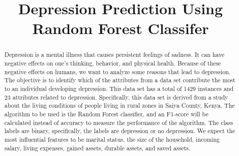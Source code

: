 \documentclass[conference]{IEEEtran}
\begin{document}
\title{Depression Prediction Using Random Forest Classifer\\}

\author{
\and
{}

\and
{}
\and
{}

}

\maketitle

\begin{abstract}
Depression is a mental illness that causes persistent feelings of sadness. It can have negative effects on one's thinking, behavior, and physical health. Because of these negative effects on humans, we want to analyze some reasons that lead to depression. The objective is to identify which of the attributes from a data set contribute the most to an individual developing depression. This data set has a total of 1429 instances and 23 attributes related to depression. Specifically, this data set is derived from a study about the living conditions of people living in rural zones in Saiya County, Kenya. The algorithm to be used is the Random Forest classifier, and an F1-score will be calculated instead of accuracy to measure the performance of the algorithm. The class labels are binary, specifically, the labels are depression or no depression. We expect the most influential features to be marital status, the size of the household, incoming salary, living expenses, gained assets, durable assets, and saved assets. 



\end{abstract}
\end{document}
